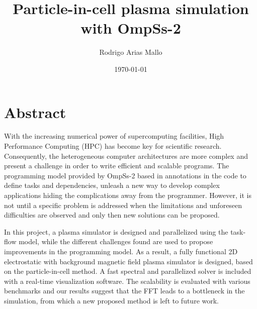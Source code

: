 \documentclass[a4paper,12pt]{book}
\title{Particle-in-cell plasma simulation with OmpSs-2
\todo[inline]{Place proper cover page}}
\author{Rodrigo Arias Mallo}
\date{\today}
\begin{document}
\frontmatter




\cleardoublepage

\chapter*{Abstract}
With the increasing numerical power of supercomputing facilities, High 
Performance Computing (HPC) has become key for scientific research.
Consequently, the heterogeneous computer architectures are more complex and 
present a challenge in order to write efficient and scalable programs.
The programming model provided by OmpSs-2 based in annotations in the code to 
define tasks and dependencies, unleash a new way to develop complex applications 
hiding the complications away from the programmer.
However, it is not until a specific problem is addressed when the limitations 
and unforeseen difficulties are observed and only then new solutions can be 
proposed.

In this project, a plasma simulator is designed and parallelized using the 
task-flow model, while the different challenges found are used to propose 
improvements in the programming model.
%
As a result, a fully functional 2D electrostatic with background magnetic field 
plasma simulator is designed, based on the particle-in-cell method. A fast 
spectral and parallelized solver is included with a real-time visualization 
software.
%
The scalability is evaluated with various benchmarks and our results suggest 
that the FFT leads to a bottleneck in the simulation, from which a new proposed 
method is left to future work.






\end{document}
